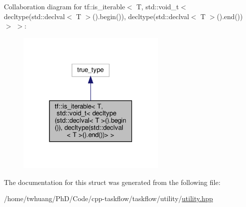 Collaboration diagram for tf\+:\+:is\+\_\+iterable$<$ T, std\+:\+:void\+\_\+t$<$ decltype(std\+:\+:declval$<$ T $>$().begin()), decltype(std\+:\+:declval$<$ T $>$().end())$>$ $>$\+:\nopagebreak
\begin{figure}[H]
\begin{center}
\leavevmode
\includegraphics[width=206pt]{structtf_1_1is__iterable_3_01T_00_01std_1_1void__t_3_01decltype_07std_1_1declval_3_01T_01_4_07_09bc35699403c124a31814ace50d8a718}
\end{center}
\end{figure}


The documentation for this struct was generated from the following file\+:\begin{DoxyCompactItemize}
\item 
/home/twhuang/\+Ph\+D/\+Code/cpp-\/taskflow/taskflow/utility/\hyperlink{utility_8hpp}{utility.\+hpp}\end{DoxyCompactItemize}
